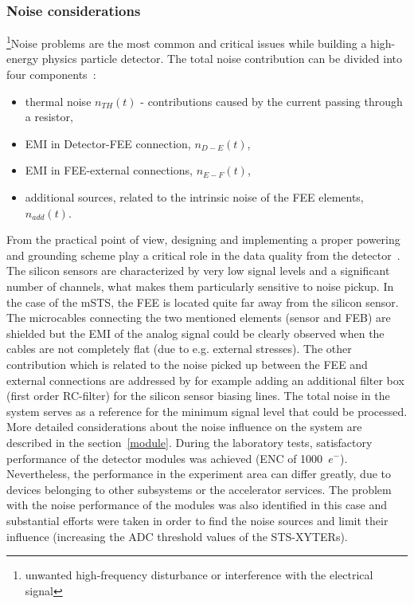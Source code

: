 \subsubsection{Noise considerations}
\footnote{unwanted high-frequency disturbance or interference with the electrical signal}{Noise} problems are the most common and critical issues while building a high-energy physics particle detector. The total noise contribution can be divided into four components~\cite{noise_twepp2008}:
\begin{itemize}
    \item thermal noise $n_{TH}(t)$ - contributions caused by the current passing through a resistor,
    \item \gls{EMI} in Detector-\gls{FEE} connection, $n_{D-E}(t)$,
    \item \gls{EMI} in \gls{FEE}-external connections, $n_{E-F}(t)$,
    \item additional sources, related to the intrinsic noise of the FEE elements, $n_{add}(t)$.
\end{itemize}
From the practical point of view, designing and implementing a proper powering and grounding scheme play a critical role in the data quality from the detector~\cite{Bobillier:1159563}. The silicon sensors are characterized by very low signal levels and a significant number of channels, what makes them particularly sensitive to noise pickup. In the case of the \gls{mSTS}, the \gls{FEE} is located quite far away from the silicon sensor. The microcables connecting the two mentioned elements (sensor and \gls{FEB}) are shielded but the \gls{EMI} of the analog signal could be clearly observed when the cables are not completely flat (due to e.g. external stresses). The other contribution which is related to the noise picked up between the \gls{FEE} and external connections are addressed by for example adding an additional filter box (first order RC-filter) for the silicon sensor biasing lines. The total noise in the system serves as a reference for the minimum signal level that could be processed. More detailed considerations about the noise influence on the system are described in the section~\ref{module}. During the laboratory tests, satisfactory performance of the detector modules was achieved (\gls{ENC} of 1000~$e^{-}$). Nevertheless, the performance in the experiment area can differ greatly, due to devices belonging to other subsystems or the accelerator services. The problem with the noise performance of the modules was also identified in this case and substantial efforts were taken in order to find the noise sources and limit their influence (increasing the ADC threshold values of the STS-XYTERs). 

